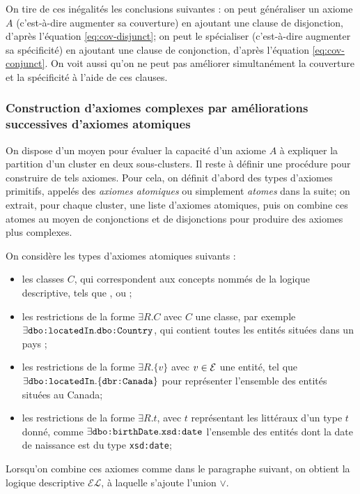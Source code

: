 On tire de ces inégalités les conclusions suivantes : on peut généraliser un axiome $A$ (c'est-à-dire augmenter sa couverture) en ajoutant une clause de disjonction, d'après l'équation \ref{eq:cov-disjunct}; on peut le spécialiser (c'est-à-dire augmenter sa spécificité) en ajoutant une clause de conjonction, d'après l'équation \ref{eq:cov-conjunct}. On voit aussi qu'on ne peut pas améliorer simultanément la couverture et la spécificité à l'aide de ces clauses.


\subsubsection{Construction d'axiomes complexes par améliorations successives d'axiomes atomiques}

On dispose d'un moyen pour évaluer la capacité d'un axiome $A$ à expliquer la partition d'un cluster en deux sous-clusters. Il reste à définir une procédure pour construire de tels axiomes. Pour cela, on définit d'abord des types d'axiomes primitifs, appelés des \textit{axiomes atomiques} ou simplement \textit{atomes} dans la suite; on extrait, pour chaque cluster, une liste d'axiomes atomiques, puis on combine ces atomes au moyen de conjonctions et de disjonctions pour produire des axiomes plus complexes.

On considère les types d'axiomes atomiques suivants :
\begin{itemize}
    \item les classes $C$, qui correspondent aux concepts nommés de la logique descriptive, tels que ,  ou ;
    \item les restrictions de la forme $\exists R.C$ avec $C$ une classe, par exemple $\exists \texttt{dbo:locatedIn}.\allowbreak \texttt{dbo:Country}$, qui contient toutes les entités situées dans un pays ;
    \item les restrictions de la forme $\exists R.\{v\}$ avec $v \in \mathcal{E}$ une entité, tel que $\exists \texttt{dbo:locatedIn}.\allowbreak \{\texttt{dbr:Canada}\}$ pour représenter l'ensemble des entités situées au Canada;
    \item les restrictions de la forme $\exists R.t$, avec $t$ représentant les littéraux d'un type $t$ donné, comme $\exists \texttt{dbo:birthDate}.\texttt{xsd:date}$ l'ensemble des entités dont la date de naissance est du type \texttt{xsd:date};
\end{itemize}
Lorsqu'on combine ces axiomes comme dans le paragraphe suivant, on obtient la logique descriptive $\mathcal{EL}$, à laquelle s'ajoute l'union $\lor$.

